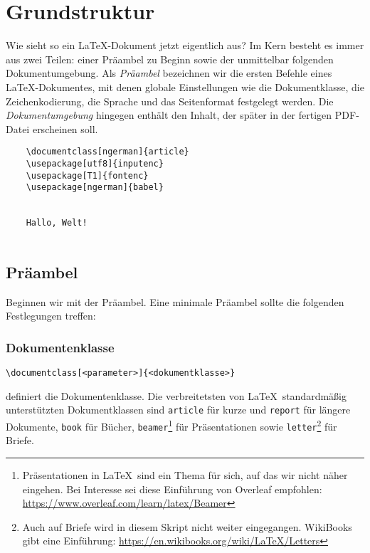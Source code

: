 \section{Grundstruktur}

Wie sieht so ein \LaTeX-Dokument jetzt eigentlich aus?
Im Kern besteht es immer aus zwei Teilen: einer Präambel zu Beginn sowie der unmittelbar folgenden Dokumentumgebung.
Als \emph{Präambel} bezeichnen wir die ersten Befehle eines \LaTeX-Dokumentes, mit denen globale Einstellungen wie die Dokumentklasse, die Zeichenkodierung, die Sprache und das Seitenformat festgelegt werden.
Die \emph{Dokumentumgebung} hingegen enthält den Inhalt, der später in der fertigen PDF-Datei erscheinen soll.

\begin{listing}[H]
  \begin{verbatim}
    \documentclass[ngerman]{article}
    \usepackage[utf8]{inputenc}
    \usepackage[T1]{fontenc}
    \usepackage[ngerman]{babel}
  
    
    Hallo, Welt!
    
  \end{verbatim}
  \caption{Beispielhafter Aufbau eines einfachen \LaTeX-Dokuments mit Präambel und Dokumentumgebung}
  \label{lst:grundaufbau-latex-dokument}
\end{listing}

\subsection{Präambel}
Beginnen wir mit der Präambel.
Eine minimale Präambel sollte die folgenden Festlegungen treffen:

\subsubsection{Dokumentenklasse}\label{subsubsec:dokumentklasse}
\begin{verbatim}
\documentclass[<parameter>]{<dokumentklasse>}
\end{verbatim}

definiert die Dokumentenklasse. 
Die verbreitetsten von \LaTeX\ standardmäßig unterstützten Dokumentklassen sind \texttt{article} für kurze und \texttt{report} für längere Dokumente, \texttt{book} für Bücher, \texttt{beamer}\footnote{Präsentationen in \LaTeX\ sind ein Thema für sich, auf das wir nicht näher eingehen. Bei Interesse sei diese Einführung von Overleaf empfohlen: \url{https://www.overleaf.com/learn/latex/Beamer}} für Präsentationen sowie \texttt{letter}\footnote{Auch auf Briefe wird in diesem Skript nicht weiter eingegangen. WikiBooks gibt eine Einführung: \url{https://en.wikibooks.org/wiki/LaTeX/Letters}} für Briefe.

